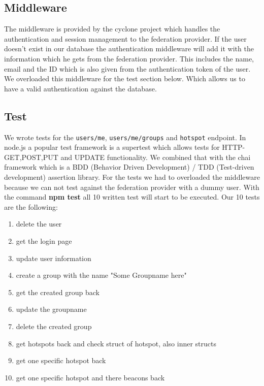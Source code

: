 
\subsection{Middleware}
\label{backend-middleware}

The middleware is provided by the cyclone project which handles the authentication and session management to the federation provider. If the user doesn't exist in our database the authentication middleware will add it with the information which he gets from the federation provider. This includes the name, email and the ID which is also given from the authentication token of the user. We overloaded this middleware for the test section below. Which allows us to have a valid authentication against the database.

\subsection{Test}

We wrote tests for the \texttt{users/me}, \texttt{users/me/groups} and \texttt{hotspot} endpoint. In node.js a popular test framework is a supertest which allows tests for HTTP-GET,POST,PUT and UPDATE functionality. We combined that with the chai framework which is a BDD (Behavior Driven Development) / TDD (Test-driven development) assertion library. For the tests we had to overloaded the middleware because we can not test against the federation provider with a dummy user. With the command \textbf{npm test} all 10 written test will start to be executed. Our 10 tests are the following:

\begin{enumerate}
  \item delete the user
  \item get the login page
  \item update user information
  \item create a group with the name "Some Groupname here"
  \item get the created group back
  \item update the groupname
  \item delete the created group
  \item get hotspots back and check struct of hotspot, also inner structs
  \item get one specific hotspot back
  \item get one specific hotspot and there beacons back
\end{enumerate}

